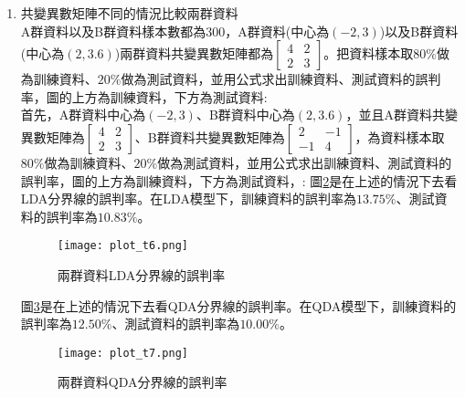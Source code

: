 \documentclass[12pt, a4paper]{article}
\begin{document}
\begin{enumerate}
圖\;\ref{fig:plot_t4.png}\;是在上述的情況下去看\;KNN\;分界線的誤判率，在這邊設\;$K=15$\;。在KNN模型下，訓練資料的誤判率為\;$13.54\%$\;、測試資料的誤判率為\;$8.33\%$\;。
\begin{figure}[H]
\centering
\texttt{[image: plot\_t4.png]}
\caption{兩群資料KNN分界線的誤判率}
\label{fig:plot_t4.png}
\end{figure}

因此，透過測試資料的錯判率比較，得出在共變異數矩陣都為\;$\begin{bmatrix}4 & 2 \\2 & 3 \end{bmatrix}$\;的情況比較兩群資料時，使用KNN模型，並且\;$K=15$\;時是最好的。

\item 共變異數矩陣不同的情況比較兩群資料\\
A群資料以及B群資料樣本數都為\;$300$\;，A群資料(中心為\;$(-2,3)$\;)以及B群資料(中心為\;$(2,3.6)$\;)兩群資料共變異數矩陣都為\;$\begin{bmatrix}4 & 2 \\2 & 3 \end{bmatrix}$\;。把資料樣本取\;$80\%$\;做為訓練資料、\;$20\%$\;做為測試資料，並用公式求出訓練資料、測試資料的誤判率，圖的上方為訓練資料，下方為測試資料\;:\\
首先，A群資料中心為\;$(-2,3)$\;、B群資料中心為\;$(2,3.6)$\;，並且A群資料共變異數矩陣為\;$\begin{bmatrix}4 & 2 \\2 & 3 \end{bmatrix}$\;、B群資料共變異數矩陣為\;$\begin{bmatrix}2 & -1 \\-1 & 4 \end{bmatrix}$\;，為資料樣本取\;$80\%$\;做為訓練資料、\;$20\%$\;做為測試資料，並用公式求出訓練資料、測試資料的誤判率，圖的上方為訓練資料，下方為測試資料，\;:
圖\;\ref{fig:plot_t6.png}\;是在上述的情況下去看\;LDA\;分界線的誤判率。在LDA模型下，訓練資料的誤判率為\;$13.75\%$\;、測試資料的誤判率為\;$10.83\%$\;。

\begin{figure}[H]
\centering
\texttt{[image: plot\_t6.png]}
\caption{兩群資料LDA分界線的誤判率}
\label{fig:plot_t6.png}
\end{figure}

圖\;\ref{fig:plot_t7.png}\;是在上述的情況下去看\;QDA\;分界線的誤判率。在QDA模型下，訓練資料的誤判率為\;$12.50\%$\;、測試資料的誤判率為\;$10.00\%$\;。
\begin{figure}[h]
\centering
\texttt{[image: plot\_t7.png]}
\caption{兩群資料QDA分界線的誤判率}
\label{fig:plot_t7.png}
\end{figure}


\end{enumerate}
\end{document}

